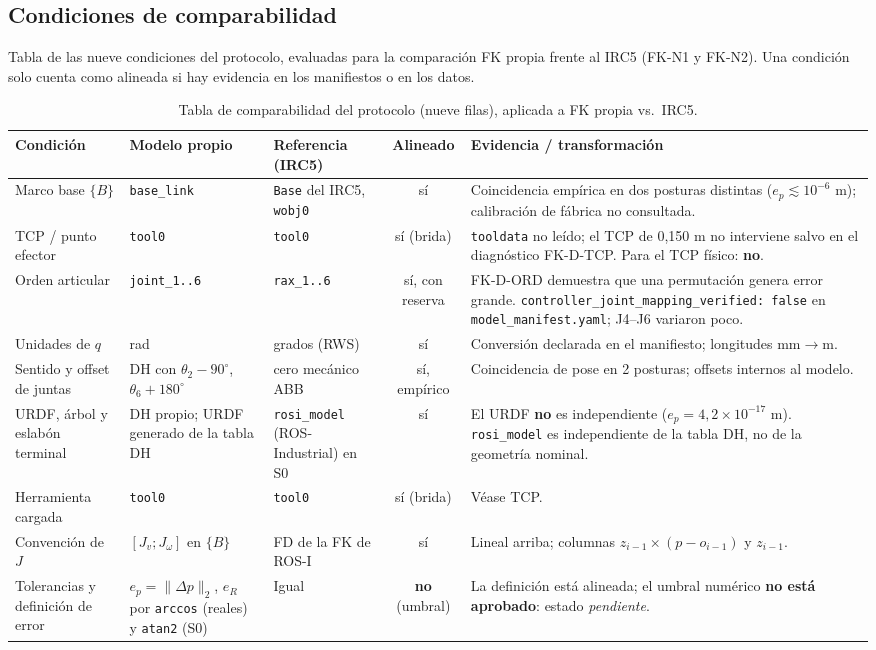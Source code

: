 \documentclass[10pt,a4paper]{article}
\newcommand{\ep}{e_p}
\newcommand{\eR}{e_R}
\begin{document}
\subsection{Condiciones de comparabilidad}
Tabla de las nueve condiciones del protocolo, evaluadas para la comparación FK propia frente al IRC5 (FK-N1 y FK-N2). Una condición solo cuenta como alineada si hay evidencia en los manifiestos o en los datos.

\begin{table}[H]
\centering\scriptsize
\renewcommand{\arraystretch}{1.2}
\begin{tabularx}{\textwidth}{@{}>{\raggedright\arraybackslash}p{3.0cm}>{\raggedright\arraybackslash}p{2.5cm}>{\raggedright\arraybackslash}p{2.5cm}c>{\raggedright\arraybackslash}X@{}}
\toprule
\textbf{Condición} & \textbf{Modelo propio} & \textbf{Referencia (IRC5)} & \textbf{Alineado} & \textbf{Evidencia / transformación}\\
\midrule
Marco base $\{B\}$ & \texttt{base\_link} & \texttt{Base} del IRC5, \texttt{wobj0} & sí & Coincidencia empírica en dos posturas distintas ($\ep\lesssim10^{-6}$ m); calibración de fábrica no consultada.\\
TCP / punto efector & \texttt{tool0} & \texttt{tool0} & sí (brida) & \texttt{tooldata} no leído; el TCP de 0,150 m no interviene salvo en el diagnóstico FK-D-TCP. Para el TCP físico: \textbf{no}.\\
Orden articular & \texttt{joint\_1..6} & \texttt{rax\_1..6} & sí, con reserva & FK-D-ORD demuestra que una permutación genera error grande. \texttt{controller\_joint\_mapping\_verified: false} en \texttt{model\_manifest.yaml}; J4--J6 variaron poco.\\
Unidades de $q$ & rad & grados (RWS) & sí & Conversión declarada en el manifiesto; longitudes mm$\to$m.\\
Sentido y offset de juntas & DH con $\theta_2{-}90^\circ$, $\theta_6{+}180^\circ$ & cero mecánico ABB & sí, empírico & Coincidencia de pose en 2 posturas; offsets internos al modelo.\\
URDF, árbol y eslabón terminal & DH propio; URDF generado de la tabla DH & \texttt{rosi\_model} (ROS-Industrial) en S0 & sí & El URDF \textbf{no} es independiente ($\ep=4{,}2\times10^{-17}$ m). \texttt{rosi\_model} es independiente de la tabla DH, no de la geometría nominal.\\
Herramienta cargada & \texttt{tool0} & \texttt{tool0} & sí (brida) & Véase TCP.\\
Convención de $J$ & $[J_v;J_\omega]$ en $\{B\}$ & FD de la FK de ROS-I & sí & Lineal arriba; columnas $z_{i-1}\times(p-o_{i-1})$ y $z_{i-1}$.\\
Tolerancias y definición de error & $\ep=\lVert\Delta p\rVert_2$, $\eR$ por \texttt{arccos} (reales) y \texttt{atan2} (S0) & Igual & \textbf{no} (umbral) & La definición está alineada; el umbral numérico \textbf{no está aprobado}: estado \textit{pendiente}.\\
\bottomrule
\end{tabularx}
\caption{Tabla de comparabilidad del protocolo (nueve filas), aplicada a FK propia vs.\ IRC5.}
\label{tab:comparabilidad}
\end{table}
\end{document}
